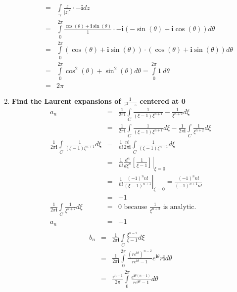 \documentclass{article}%
\newcommand\abs[1]{\left|#1\right|}
\newcommand\I{\textbf{i}}
\begin{document}
\begin{enumerate}
\begin{enumerate}[label=\alph*)]
\begin{eqnarray*}
                &=& \int\limits_{\gamma}{\frac{z}{\abs{z}^2} \cdot -\I dz} \\
                &=& \int\limits_{0}^{2\pi}{\frac{\cos(\theta)+\I\sin(\theta)}{1} \cdot -\I(-\sin(\theta)+\I\cos(\theta)) d\theta} \\
                &=& \int\limits_{0}^{2\pi}{(\cos(\theta)+\I\sin(\theta)) \cdot (\cos(\theta)+\I\sin(\theta))d\theta} \\
                &=& \int\limits_{0}^{2\pi}{\cos^2(\theta) + \sin^2(\theta) d\theta} = \int\limits_{0}^{2\pi}{1~d\theta} \\
                &=& 2\pi
        \end{eqnarray*}
    \end{enumerate}
    \item %
    \textbf{Find the Laurent expansions of $\frac{1}{z^2-z}$ centered at 0}
    \begin{eqnarray*}
        a_n &=& \frac{1}{2\pi\I}\int\limits_{C}{\frac{1}{(\xi-1)\xi^{n+1}}-\frac{1}{\xi^{n+2}}d\xi} \\
            &=& \frac{1}{2\pi\I}\int\limits_{C}{\frac{1}{(\xi-1)\xi^{n+1}}d\xi}-\frac{1}{2\pi\I}\int\limits_{C}{\frac{1}{\xi^{n+2}}d\xi}\\
        \frac{1}{2\pi\I}\int\limits_{C}{\frac{1}{(\xi-1)\xi^{n+1}}d\xi} &=& \frac{1}{n!}\frac{n!}{2\pi\I}\int\limits_{C}{\frac{1}{(\xi-1)\xi^{n+1}}d\xi} \\
            &=& \left.\frac{1}{n!}\frac{d^n}{d\xi^n}\left[\frac{1}{\xi-1}\right]\right|_{\xi=0} \\
            &=& \left.\frac{1}{n!}\frac{(-1)^n n!}{(\xi-1)^{n+1}}\right|_{\xi=0} = \frac{(-1)^n n!}{(-1)^{n+1}n!}\\
            &=& -1 \\
        \frac{1}{2\pi\I}\int\limits_{C}{\frac{1}{\xi^{n+2}}d\xi} &=& 0 \text{ because $\frac{1}{\xi^{n+2}}$ is analytic.} \\
        a_n &=& -1 \\
    \end{eqnarray*}
    \begin{eqnarray*}
        b_n &=& \frac{1}{2\pi\I}\int\limits_{C}{\frac{\xi^{n-2}}{\xi-1}d\xi} \\
            &=& \frac{1}{2\pi\I}\int\limits_{0}^{2\pi}{\frac{(re^{\I\theta})^{n-2}}{re^{\I\theta}-1}e^{\I\theta}r\I d\theta} \\
            &=& \frac{r^{n-1}}{2\pi}\int\limits_{0}^{2\pi}{\frac{e^{\I\theta(n-1)}}{re^{\I\theta}-1} d\theta} \\

\end{eqnarray*}
\end{enumerate}
\end{document}
